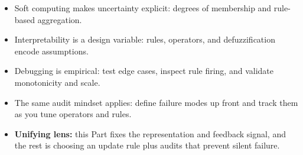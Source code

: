



\begin{tcolorbox}[summarybox, title={Part III takeaways}]
\begin{itemize}
  \item Soft computing makes uncertainty explicit: degrees of membership and rule-based aggregation.
  \item Interpretability is a design variable: rules, operators, and defuzzification encode assumptions.
  \item Debugging is empirical: test edge cases, inspect rule firing, and validate monotonicity and scale.
  \item The same audit mindset applies: define failure modes up front and track them as you tune operators and rules.
  \item \textbf{Unifying lens:} this Part fixes the representation and feedback signal, and the rest is choosing an update rule plus audits that prevent silent failure.
\end{itemize}
\end{tcolorbox}
